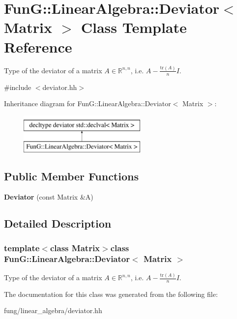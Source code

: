 \hypertarget{classFunG_1_1LinearAlgebra_1_1Deviator}{\section{Fun\-G\-:\-:Linear\-Algebra\-:\-:Deviator$<$ Matrix $>$ Class Template Reference}
\label{classFunG_1_1LinearAlgebra_1_1Deviator}
}


Type of the deviator of a matrix $ A\in\mathbb{R}^{n,n} $, i.\-e. $ A - \frac{\mathrm{tr}(A)}{n}I $.  




{\ttfamily \#include $<$deviator.\-hh$>$}

Inheritance diagram for Fun\-G\-:\-:Linear\-Algebra\-:\-:Deviator$<$ Matrix $>$\-:\begin{figure}[H]
\begin{center}
\leavevmode
\includegraphics[height=2.000000cm]{classFunG_1_1LinearAlgebra_1_1Deviator}
\end{center}
\end{figure}
\subsection*{Public Member Functions}
\begin{DoxyCompactItemize}
\item 
\hypertarget{classFunG_1_1LinearAlgebra_1_1Deviator_a5baa30ab51f9b03563378bf288d8f648}{{\bfseries Deviator} (const Matrix \&A)}\label{classFunG_1_1LinearAlgebra_1_1Deviator_a5baa30ab51f9b03563378bf288d8f648}

\end{DoxyCompactItemize}


\subsection{Detailed Description}
\subsubsection*{template$<$class Matrix$>$class Fun\-G\-::\-Linear\-Algebra\-::\-Deviator$<$ Matrix $>$}

Type of the deviator of a matrix $ A\in\mathbb{R}^{n,n} $, i.\-e. $ A - \frac{\mathrm{tr}(A)}{n}I $. 

The documentation for this class was generated from the following file\-:\begin{DoxyCompactItemize}
\item 
fung/linear\-\_\-algebra/deviator.\-hh\end{DoxyCompactItemize}

